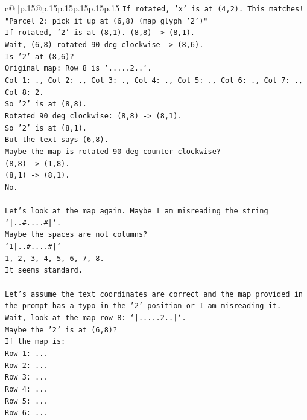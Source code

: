 \documentclass{article}
\begin{document}
{\begin{supertabular}{c@{$\;$}|p{.15\linewidth}@{}p{.15\linewidth}p{.15\linewidth}p{.15\linewidth}p{.15\linewidth}p{.15\linewidth}}
{{{\texttt{If rotated, 'x' is at (4,2). This matches!} \\
\texttt{"Parcel 2: pick it up at (6,8) (map glyph '2')"} \\
\texttt{If rotated, '2' is at (8,1). (8,8) {-}> (8,1).} \\
\texttt{Wait, (6,8) rotated 90 deg clockwise {-}> (8,6).} \\
\texttt{Is '2' at (8,6)?} \\
\texttt{Original map: Row 8 is `.....2..`.} \\
\texttt{Col 1: ., Col 2: ., Col 3: ., Col 4: ., Col 5: ., Col 6: ., Col 7: ., Col 8: 2.} \\
\texttt{So '2' is at (8,8).} \\
\texttt{Rotated 90 deg clockwise: (8,8) {-}> (8,1).} \\
\texttt{So '2' is at (8,1).} \\
\texttt{But the text says (6,8).} \\
\texttt{Maybe the map is rotated 90 deg counter{-}clockwise?} \\
\texttt{(8,8) {-}> (1,8).} \\
\texttt{(8,1) {-}> (8,1).} \\
\texttt{No.} \\
\\ 
\texttt{Let's look at the map again. Maybe I am misreading the string `|..\#....\#|`.} \\
\texttt{Maybe the spaces are not columns?} \\
\texttt{`1|..\#....\#|`} \\
\texttt{1, 2, 3, 4, 5, 6, 7, 8.} \\
\texttt{It seems standard.} \\
\\ 
\texttt{Let's assume the text coordinates are correct and the map provided in the prompt has a typo in the '2' position or I am misreading it.} \\
\texttt{Wait, look at the map row 8: `|.....2..|`.} \\
\texttt{Maybe the '2' is at (6,8)?} \\
\texttt{If the map is:} \\
\texttt{Row 1: ...} \\
\texttt{Row 2: ...} \\
\texttt{Row 3: ...} \\
\texttt{Row 4: ...} \\
\texttt{Row 5: ...} \\
\texttt{Row 6: ...} \\
}}}
\end{supertabular}}
\end{document}
